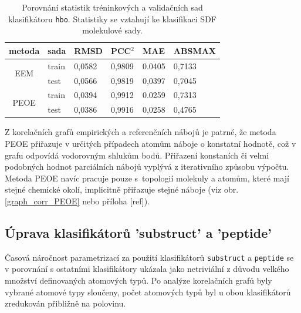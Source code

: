 \begin{table}[h]
    \renewcommand{\arraystretch}{1.4}
    \centering
    \begin{tabular}{c|l|l|l|l|l}
         \textbf{metoda} & \textbf{sada} & \textbf{RMSD} & \textbf{PCC$^2$} & \textbf{MAE} & \textbf{ABSMAX}\\
         \hline
         \multirow{2}{4em}{EEM} & train & 0,0582 & 0,9809 & 0.0405 & 0,7133  \\
         & test & 0,0566 & 0,9819 & 0,0397 & 0,7045 \\
         \hline
         \multirow{2}{4em}{PEOE} & train & 0,0394 & 0,9912 & 0.0259 & 0,7313  \\
         & test & 0,0386  & 0,9916 & 0,0258 & 0,4765 \\
    \end{tabular}
    \caption{Porovnání statistik tréninkových a validačních sad klasifikátoru \texttt{hbo}. Statistiky se vztahují ke klasifikaci SDF molekulové sady.}
    \label{prenositelnost}
\end{table}
\vspace{2cm}


Z korelačních grafů empirických a referenčních nábojů je patrné, že metoda PEOE přiřazuje v určitých případech atomům náboje o konstatní hodnotě, což v grafu odpovídá vodorovným shlukům bodů. Přiřazení konstaních či velmi podobných hodnot parciálních nábojů vyplývá z iterativního způsobu výpočtu. Metoda PEOE navíc pracuje pouze s~topologií molekuly a atomům, které mají stejné chemické okolí, implicitně přiřazuje stejné náboje (viz obr. \ref{graph_corr_PEOE} nebo příloha [ref]).

\subsection{Úprava klasifikátorů 'substruct' a 'peptide'}
Časová náročnost parametrizací za použití klasifikátorů \verb|substruct| a \verb|peptide| se v porovnání s ostatními klasifikátory ukázala jako netriviální z důvodu velkého množství definovaných atomových typů. Po analýze korelačních grafů byly vybrané atomové typy sloučeny, počet atomových typů byl u obou klasifikátorů zredukován přibližně na polovinu.

